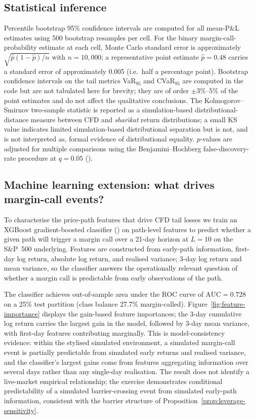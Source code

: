 \documentclass[preprint,12pt,authoryear]{elsarticle}
\theoremstyle{definition}
\begin{document}
\subsection{Statistical inference}
\label{sec:sim-inference}

Percentile bootstrap 95\% confidence intervals are computed for
all mean-P\&L estimates using 500 bootstrap resamples per cell.
For the binary margin-call-probability estimate at each cell,
Monte Carlo standard error is approximately
$\sqrt{\hat{p}(1-\hat{p})/n}$ with $n = 10{,}000$; a
representative point estimate $\hat{p} = 0.48$ carries a
standard error of approximately 0.005 (i.e.\ half a
percentage point). Bootstrap confidence intervals on the tail
metrics VaR$_{95}$ and CVaR$_{95}$ are computed in the code but
are not tabulated here for brevity; they are of order
$\pm 3\%$--$5\%$ of the point estimates and do not affect the
qualitative conclusions. The
Kolmogorov--Smirnov two-sample statistic is reported as a
simulation-based distributional-distance measure between CFD and
\emph{shar\={\i}kat} return distributions; a small KS value
indicates limited simulation-based distributional separation but is
not, and is not interpreted as, formal evidence of
distributional equality. $p$-values are adjusted for multiple
comparisons using the Benjamini--Hochberg false-discovery-rate
procedure at $q = 0.05$ (\citealp{Benjamini1995}).

\subsection{Machine learning extension: what drives margin-call
    events?}
\label{sec:sim-ml}

To characterise the price-path features that drive CFD tail losses
we train an XGBoost gradient-boosted classifier
(\citealp{ChenGuestrin2016}) on path-level features to predict
whether a given path will trigger a margin call over a 21-day
horizon at $L = 10$ on the S\&P~500 underlying. Features are
constructed from early-path information, first-day log return,
absolute log return, and realised variance; 3-day log return and
mean variance, so the classifier answers the operationally
relevant question of whether a margin call is predictable from
early observations of the path.

The classifier achieves out-of-sample area under the ROC curve
of $\text{AUC} = 0.728$ on a 25\% test partition (class balance
27.7\% margin-called). Figure~\ref{fig:feature-importance}
displays the gain-based feature importances; the 3-day
cumulative log return carries the largest gain in the model,
followed by 3-day mean variance, with first-day features
contributing marginally. This is model-consistency evidence:
within the stylised simulated environment, a simulated
margin-call event is partially predictable from simulated early
returns and realised variance, and the classifier's largest
gains come from features aggregating information over several
days rather than any single-day realisation. The result does
not identify a live-market empirical relationship; the exercise
demonstrates conditional predictability of a simulated
barrier-crossing event from simulated early-path information,
consistent with the barrier structure of
Proposition~\ref{prop:leverage-sensitivity}.
\end{document}
